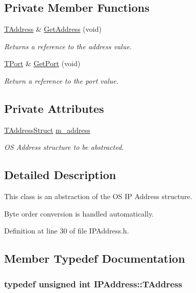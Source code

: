 \subsection*{Private Member Functions}
\begin{DoxyCompactItemize}
\item 
\hyperlink{class_i_p_address_a36831f63346275f44e8747d77a2a5d51}{T\-Address} \& \hyperlink{class_i_p_address_a0c90b37a86811781d4422c0dd2d5b6b5}{Get\-Address} (void)
\begin{DoxyCompactList}\small\item\em Returns a reference to the address value. \end{DoxyCompactList}\item 
\hyperlink{class_i_p_address_a51188195685c31d4258c0a078cc37154}{T\-Port} \& \hyperlink{class_i_p_address_a5c8a6aeae1105603538c2661c68fd6bb}{Get\-Port} (void)
\begin{DoxyCompactList}\small\item\em Return a reference to the port value. \end{DoxyCompactList}\end{DoxyCompactItemize}
\subsection*{Private Attributes}
\begin{DoxyCompactItemize}
\item 
\hyperlink{class_i_p_address_a45062a631f57459b18c10c1c8fe310bf}{T\-Address\-Struct} \hyperlink{class_i_p_address_aaafe20f26b2569a5ac9cd3b61b5c0c50}{m\-\_\-address}
\begin{DoxyCompactList}\small\item\em O\-S Address structure to be abstracted. \end{DoxyCompactList}\end{DoxyCompactItemize}


\subsection{Detailed Description}
This class is an abstraction of the O\-S I\-P Address structure. 

Byte order conversion is handled automatically. 

Definition at line 30 of file I\-P\-Address.\-h.



\subsection{Member Typedef Documentation}
\hypertarget{class_i_p_address_a36831f63346275f44e8747d77a2a5d51}{
\subsubsection[{T\-Address}]{\setlength{\rightskip}{0pt plus 5cm}typedef unsigned int {\bf I\-P\-Address\-::\-T\-Address}}}\label{class_i_p_address_a36831f63346275f44e8747d77a2a5d51}


